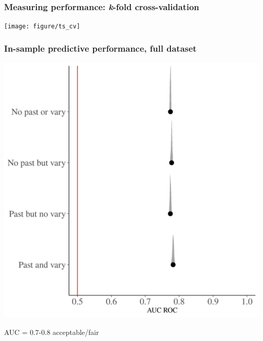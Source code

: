 \documentclass{beamer}
\begin{document}
\begin{frame}
  \frametitle{Measuring performance: \textit{k}-fold cross-validation}

  \begin{center}
    \texttt{[image: figure/ts\_cv]}
  \end{center}


\end{frame}

\begin{frame}
  \frametitle{In-sample predictive performance, full dataset}

  \begin{center}
    \includegraphics[width=\textwidth,height=0.8\textheight,keepaspectratio=true]{../results/figure/auc_hist_zoom}

    \footnotesize{AUC = 0.7-0.8 acceptable/fair}
  \end{center}

\end{frame}
\end{document}
